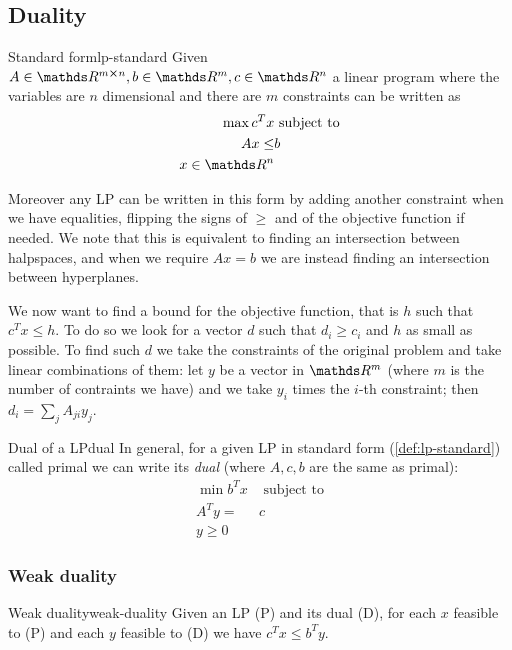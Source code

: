 \documentclass[12pt]{extarticle}
\begin{document}
\subsection{Duality}

\begin{definition}{Standard form}{lp-standard}
	Given $A \in \R^{m\cross n}, b \in \R^m, c \in \R^n$
	a linear program where the variables are $n$ dimensional and there are $m$ constraints
	can be written as
	\begin{align}
		\max c^T x & \text{ subject to} \\
		Ax \leq    & b                  \\
		x \in \R^n
	\end{align}
\end{definition}

Moreover any LP can be written in this form by adding another constraint when we have equalities,
flipping the signs of $\geq$ and of the objective function if needed.
We note that this is equivalent to finding an intersection between halpspaces, and when we require
$Ax = b$ we are instead finding an intersection between hyperplanes.

We now want to find a bound for the objective function, that is $h$ such that $c^T x \leq h$.
To do so we look for a vector $d$ such that $d_i \geq c_i$ and $h$ as small as possible.
To find such $d$ we take the constraints of the original problem and
take linear combinations of them: let $y$ be a vector in $\R^m$
(where $m$ is the number of contraints we have) and we take $y_i$ times the $i$-th constraint;
then $d_i = \sum_{j} A_{ji} y_j$.

\begin{definition}{Dual of a LP}{dual}
	In general, for a given LP in standard form (\cref{def:lp-standard}) called primal
	we can write its \emph{dual} (where $A, c, b$ are the same as primal):
	\begin{align}
		\min b^T x & \text{ subject to} \\
		A^T y =    & c                  \\
		y \geq 0
	\end{align}
\end{definition}

\subsubsection{Weak duality}

\begin{theorem}{Weak duality}{weak-duality}
	Given an LP (P) and its dual (D), for each $x$ feasible to (P) and each $y$ feasible to (D)
	we have $c^T x \leq b^T y$.
\end{theorem}
\end{document}
